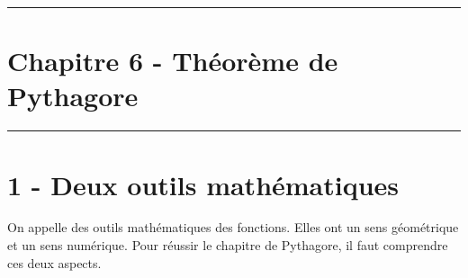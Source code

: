 \documentclass[12pt]{article}
\newcommand{\horrule}[1]{\rule{\linewidth}{#1}} %
\begin{document}

\newtheorem{Definition}{Définition}
\newtheorem{Theorem}{Théorème}
\newtheorem{Proposition}{Propriété}

\renewcommand{\labelitemi}{$\bullet$}
\renewcommand{\labelitemii}{$\circ$}

\setlength{\columnseprule}{1pt}

\horrule{2px}
\section*{Chapitre 6 - Théorème de Pythagore}
\horrule{2px}

\section*{1 - Deux outils mathématiques}

On appelle des outils mathématiques des fonctions. Elles ont un sens géométrique et un sens numérique. Pour réussir le chapitre de Pythagore, il faut comprendre ces deux aspects. 
\end{document}
